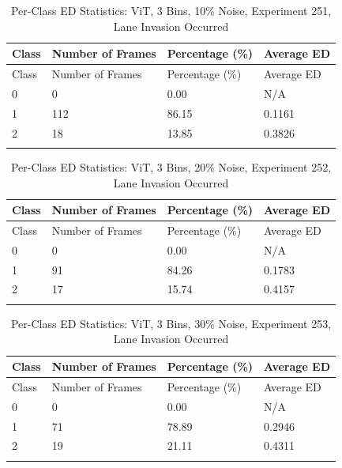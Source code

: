 
\begin{longtable}{@{}llll@{}}
\toprule
Class & Number of Frames & Percentage (\%) & Average ED \\
\midrule
\endfirsthead
\toprule
Class & Number of Frames & Percentage (\%) & Average ED \\
\midrule
\endhead
0 & 0 & 0.00 & N/A \\
1 & 112 & 86.15 & 0.1161 \\
2 & 18 & 13.85 & 0.3826 \\
\bottomrule
\caption{Per-Class ED Statistics: ViT, 3 Bins, 10\% Noise, Experiment 251, Lane Invasion Occurred}
\label{tab:exp251_ViT_3bins_10noise}
\end{longtable}
        


\begin{longtable}{@{}llll@{}}
\toprule
Class & Number of Frames & Percentage (\%) & Average ED \\
\midrule
\endfirsthead
\toprule
Class & Number of Frames & Percentage (\%) & Average ED \\
\midrule
\endhead
0 & 0 & 0.00 & N/A \\
1 & 91 & 84.26 & 0.1783 \\
2 & 17 & 15.74 & 0.4157 \\
\bottomrule
\caption{Per-Class ED Statistics: ViT, 3 Bins, 20\% Noise, Experiment 252, Lane Invasion Occurred}
\label{tab:exp252_ViT_3bins_20noise}
\end{longtable}
        


\begin{longtable}{@{}llll@{}}
\toprule
Class & Number of Frames & Percentage (\%) & Average ED \\
\midrule
\endfirsthead
\toprule
Class & Number of Frames & Percentage (\%) & Average ED \\
\midrule
\endhead
0 & 0 & 0.00 & N/A \\
1 & 71 & 78.89 & 0.2946 \\
2 & 19 & 21.11 & 0.4311 \\
\bottomrule
\caption{Per-Class ED Statistics: ViT, 3 Bins, 30\% Noise, Experiment 253, Lane Invasion Occurred}
\label{tab:exp253_ViT_3bins_30noise}
\end{longtable}
        

